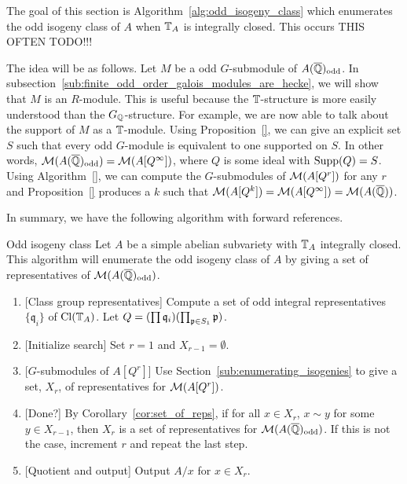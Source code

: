 \documentclass{article}
\renewcommand{\q}{\mathfrak{q}}
\newcommand{\odd}{\mathrm{odd}}
\begin{document}
The goal of this section is Algorithm~\ref{alg:odd_isogeny_class} which
enumerates the odd isogeny class of $A$ when $\mathbb{T}_A$ is integrally closed. This
occurs THIS OFTEN TODO!!!

The idea will be as follows. Let $M$ be a odd $G$-submodule of
$A(\QQbar)_\odd$. In
subsection~\ref{sub:finite_odd_order_galois_modules_are_hecke}, we will show
that $M$ is an $R$-module. This is useful because the $\mathbb{T}$-structure is more
easily understood than the $G_{\mathbb{Q}}$-structure. For example, we are now able to
talk about the support of $M$ as a $\mathbb{T}$-module. Using Proposition~\ref{}, we
can give an explicit set $S$ such that every odd $G$-module is
equivalent to one supported on $S$. In other words,
$\M(A(\QQbar)_\odd)=\M(A[Q^\infty])$, where $Q$ is some ideal with
$\operatorname{Supp}(Q)=S$. Using Algorithm~\ref{}, we can compute the $G$-submodules of
$\mathcal{M}(A[Q^r])$ for any $r$ and Proposition~\ref{} produces a $k$ such that
$\mathcal{M}(A[Q^k])=\mathcal{M}(A[Q^\infty])=\mathcal{M}(A(\overline{\mathbb{Q}}))$.

In summary, we have the following algorithm with forward references.
\begin{algorithm}{Odd isogeny class}%
    \label{alg:odd_isogeny_class}
    Let $A$ be a simple abelian subvariety with $\mathbb{T}_A$ integrally closed. This
    algorithm will enumerate the odd isogeny class of $A$ by giving a set of
    representatives of $\M(A(\QQbar)_\odd)$.
    \begin{enumerate}
        \item{} [Class group representatives]
            Compute a set of odd integral representatives $\{\q_i\}$ of
            $\operatorname{Cl}(\mathbb{T}_A)$. Let $Q = (\prod \q_i)(\prod_{\p\in S_1} \p)$. 
        \item{} [Initialize search]
            Set $r=1$ and $X_{r-1}=\emptyset$.
        \item{} [$G$-submodules of $A[Q^r]$]
            Use Section~\ref{sub:enumerating_isogenies} to give a set, $X_r$,
            of representatives for $\mathcal{M}(A[Q^r])$.
        \item{} [Done?]
            By Corollary~\ref{cor:set_of_reps}, if for all $x\in X_r$, $x\sim
            y$ for some $y\in X_{r-1}$, then $X_r$ is a set of representatives
            for $\M(A(\QQbar)_\odd)$. If this is not the case, increment $r$
            and repeat the last step.
        \item{} [Quotient and output]
            Output $A/x$ for $x\in X_r$.
    \end{enumerate}
\end{algorithm}
\end{document}
